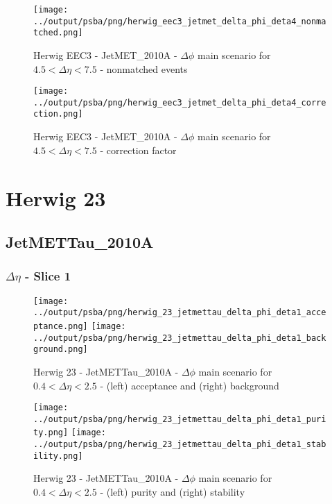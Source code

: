 \documentclass[11pt]{book}
\begin{document}
\begin{figure}[ht]
\centering
\texttt{[image: ../output/psba/png/herwig\_eec3\_jetmet\_delta\_phi\_deta4\_nonmatched.png]}
\caption{Herwig EEC3 - JetMET\_2010A - $\Delta\phi$ main scenario for $4.5 < \Delta\eta < 7.5$ - nonmatched events}
\label{fig:hw_eec3_jetmet_delta_phi_deta4_nonmatched}
\end{figure}

\begin{figure}[ht]
\centering
\texttt{[image: ../output/psba/png/herwig\_eec3\_jetmet\_delta\_phi\_deta4\_correction.png]}
\caption{Herwig EEC3 - JetMET\_2010A - $\Delta\phi$ main scenario for $4.5 < \Delta\eta < 7.5$ - correction factor}
\label{fig:hw_eec3_jetmet_delta_phi_deta4_correction}
\end{figure}



\clearpage
\section{Herwig 23}
\subsection{JetMETTau\_2010A}

\subsubsection{$\Delta\eta$ - Slice 1}

\begin{figure}[ht]
\centering
\texttt{[image: ../output/psba/png/herwig\_23\_jetmettau\_delta\_phi\_deta1\_acceptance.png]}
\texttt{[image: ../output/psba/png/herwig\_23\_jetmettau\_delta\_phi\_deta1\_background.png]}
\caption{Herwig 23 - JetMETTau\_2010A - $\Delta\phi$ main scenario for $0.4 < \Delta\eta < 2.5$ - (left) acceptance and (right) background}
\label{fig:hw_23_jetmettau_delta_phi_deta1_ab}
\end{figure}

\begin{figure}[ht]
\centering
\texttt{[image: ../output/psba/png/herwig\_23\_jetmettau\_delta\_phi\_deta1\_purity.png]}
\texttt{[image: ../output/psba/png/herwig\_23\_jetmettau\_delta\_phi\_deta1\_stability.png]}
\caption{Herwig 23 - JetMETTau\_2010A - $\Delta\phi$ main scenario for $0.4 < \Delta\eta < 2.5$ - (left) purity and (right) stability}
\label{fig:hw_23_jetmettau_delta_phi_deta1_ps}
\end{figure}
\end{document}
